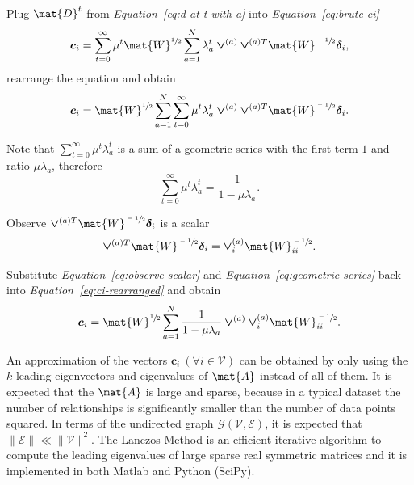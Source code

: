 \documentclass[12pt]{report}
\begin{document}
%
%


Plug $\mat{D}^t$ from \emph{Equation~\ref{eq:d-at-t-with-a}} into
\emph{Equation~\ref{eq:brute-ci}}
\begin{equation}
  \bm{c}_i = \sum_{t=0}^\infty \mu^t \mat{W}^{\sfrac{1}{2}} \sum_{a=1}^{N}
    \lambda_a^t \bm{\vee}^{(a)} \bm{\vee}^{(a)T} \mat{W}^{\sfrac{-1}{2}}
    \bm{\delta}_i,
\end{equation}
rearrange the equation and obtain
\begin{equation}
  \label{eq:ci-rearranged}
  \bm{c}_i = \mat{W}^{\sfrac{1}{2}} \sum_{a=1}^{N} \sum_{t=0}^\infty \mu^t
    \lambda_a^t \bm{\vee}^{(a)} \bm{\vee}^{(a)T} \mat{W}^{\sfrac{-1}{2}}
    \bm{\delta}_i.
\end{equation}


%
%


Note that $\sum_{t=0}^\infty \mu^t\lambda_a^t$ is a sum of a geometric series
with the first term $1$ and ratio $\mu \lambda_a$, therefore
\begin{equation}
  \label{eq:geometric-series}
  \sum_{t=0}^\infty \mu^t\lambda_a^t = \frac{1}{1 - \mu \lambda_a}.
\end{equation}


Observe $\bm{\vee}^{(a)T} \mat{W}^{\sfrac{-1}{2}} \bm{\delta}_i$ is a scalar
\begin{equation}
  \label{eq:observe-scalar}
  \bm{\vee}^{(a)T} \mat{W}^{\sfrac{-1}{2}} \bm{\delta}_i =
    \bm{\vee}^{(a)}_i \mat{W}^{\sfrac{-1}{2}}_{ii}.
\end{equation}


Substitute \emph{Equation~\ref{eq:observe-scalar}} and \emph{Equation~\ref{eq:geometric-series}}
back into \emph{Equation~\ref{eq:ci-rearranged}} and obtain
\begin{equation}
  \label{eq:ci-rearranged-geometric}
  \bm{c}_i = \mat{W}^{\sfrac{1}{2}} \sum_{a=1}^{N} \frac{1}{1 - \mu \lambda_a}
    \bm{\vee}^{(a)} \bm{\vee}^{(a)}_i \mat{W}^{\sfrac{-1}{2}}_{ii}.
\end{equation}


%
%


An approximation of the vectors $\bm{c}_i \ (\forall i \in \mathcal{V})$ can be
obtained by only using the $k$ leading eigenvectors and eigenvalues of $\mat{A}$
instead of all of them. It is expected that the $\mat{A}$ is large and sparse,
because in a typical dataset the number of relationships is significantly
smaller than the number of data points squared. In terms of the undirected graph
$\mathcal{G}(\mathcal{V}, \mathcal{E})$, it is expected that $\|\mathcal{E}\|
\ll \|\mathcal{V}\|^2$. The Lanczos Method is an efficient iterative algorithm
to compute the leading eigenvalues of large sparse real symmetric matrices
\cite{calvetti1994implicitly} and it is implemented in both Matlab\cite{matlab:eigs} and Python
(SciPy).
\end{document}

